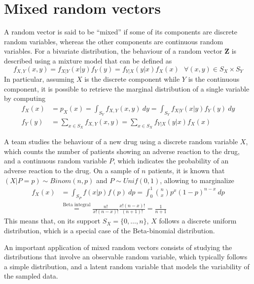 \documentclass{report}
\begin{document}
\section{Mixed random vectors}
A random vector is said to be ``mixed'' if some of its components are discrete random variables, whereas the other components are continuous random variables. \newline
For a bivariate distribution, the behaviour of a random vector $\displaystyle \mathbf{Z}$ is described using a mixture model that can be defined as
\[f_{X, Y}(x, y) = f_{X|Y}(x|y)f_Y(y) = f_{Y|X}(y|x)f_X(x) \text{ } \forall (x, y) \in S_X \times S_Y\]
In particular, assuming $\displaystyle X$ is the discrete component while $\displaystyle Y$ is the continuous component, it is possible to retrieve the marginal distribution of a single variable by computing
\begin{align*}
    f_X(x) &= p_X(x) = \int_{S_Y} f_{X, Y}(x, y) \ dy = \int_{S_Y} f_{X|Y}(x|y)f_Y(y) \ dy \\
    f_Y(y) &= \sum_{x \in S_X} f_{X, Y}(x, y) = \sum_{x \in S_X} f_{Y|X}(y|x)f_X(x)
\end{align*}
\begin{examplebox}
    A team studies the behaviour of a new drug using a discrete random variable $\displaystyle X$, which counts the number of patients showing an adverse reaction to the drug, and a continuous random variable $\displaystyle P$, which indicates the probability of an adverse reaction to the drug. \newline
    On a sample of $\displaystyle n$ patients, it is known that $\displaystyle (X|P = p) \sim Binom(n, p)$ and $\displaystyle P \sim Unif(0, 1)$, allowing to marginalize
    \begin{align*}
        f_X(x)
            &= \int_{S_P} f(x|p)f(p) \ dp = \int_0^1 \binom{n}{x}p^x(1 - p)^{n - x} \ dp \\
            &\stackrel{\text{Beta integral}}{=} \frac{n!}{x!(n - x)!}\frac{x!(n - x)!}{(n + 1)!} = \frac{1}{n + 1}
    \end{align*}
    \noindent This means that, on its support $\displaystyle S_X = \{0, \dots, n\}$, $\displaystyle X$ follows a discrete uniform distribution, which is a special case of the Beta-binomial distribution.
\end{examplebox}
\noindent An important application of mixed random vectors consists of studying the distributions that involve an observable random variable, which typically follows a simple distribution, and a latent random variable that models the variability of the sampled data.
\end{document}
